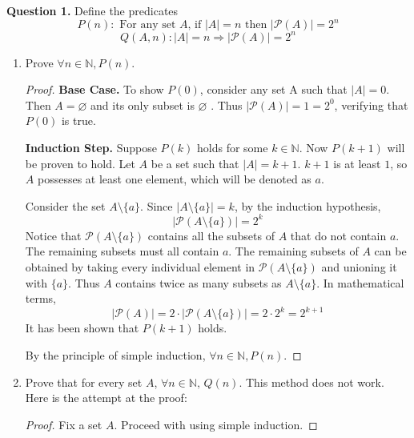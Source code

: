 \documentclass[11pt]{article}
\begin{document}
    \noindent\textbf{Question 1.} Define the predicates
    \[
        P(n)\colon \text{ For any set } A\text{, if } |A|=n \text{ then } |\mathcal{P}(A)|=2^n
    \]
    \[
        Q(A,n)\colon |A|=n \Longrightarrow |\mathcal{P}(A)|=2^n
    \]
    \begin{enumerate}[label=\alph*)]
        \item Prove \(\forall n \in \mathbb{N} , P(n)\).
        \begin{proof}
            \noindent\textbf{Base Case.} To show \(P(0)\), consider any set A such that \(\left\vert A \right\vert = 0\). Then \(A = \varnothing \) and its only subset is \(\varnothing\) . Thus \(\left\vert \mathcal{P}(A) \right\vert = 1 = 2^0\), verifying that \(P(0)\) is true.

            \noindent\textbf{Induction Step.} Suppose \(P(k)\) holds for some \(k \in \mathbb{N} \). Now \(P(k+1)\) will be proven to hold. Let \(A\) be a set such that \(\left\vert A \right\vert = k+1\). \(k+1\) is at least \(1\), so \(A\) possesses at least one element, which will be denoted as \(a\).
            
            Consider the set \(A\setminus \{ a \} \). Since \(\bigl\vert A\setminus\{a\}\bigr\vert = k \), by the induction hypothesis,
            \[
                \bigl\vert\mathcal{P}(A\setminus\{a\})\bigr\vert = 2^k
            \]
            Notice that \(\mathcal{P}(A\setminus\{a\})\) contains all the subsets of \(A\) that do not contain \(a\). The remaining subsets must all contain \(a\). The remaining subsets of \(A\) can be obtained by taking every individual element in \(\mathcal{P}(A\setminus\{a\})\) and unioning it with \(\{a\}\). Thus \(A\) contains twice as many subsets as \(A\setminus \{a\}\). In mathematical terms, 
            \[
                \left\vert \mathcal{P}(A) \right\vert = 2 \cdot \left\vert \mathcal{P}(A\setminus\{a\}) \right\vert = 2 \cdot 2^k = 2^{k+1} 
            \]
            It has been shown that \(P(k+1)\) holds.

            \noindent By the principle of simple induction, \(\forall n \in \mathbb{N} , P(n)\). 

        \end{proof}
        \item  Prove that for every set \(A\), \(\forall n \in \mathbb{N} \text{, } Q(n)\).
        This method does not work. Here is the attempt at the proof:
        \begin{proof}
            Fix a set \(A\). Proceed with using simple induction.


\end{proof}
\end{enumerate}
\end{document}
